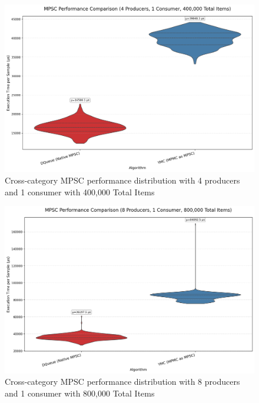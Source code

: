 \begin{figure}[H]
\centering
\caption{Cross-category MPSC performance distribution with 4 producers and 1 consumer with 400,000 Total Items}
\label{fig:cross-mpsc-violin-4p}
\includegraphics[width=\textwidth]{images/results/best_in_mpsc_performance_violin_4P1C.png}
\end{figure}

\begin{figure}[H]
\centering
\caption{Cross-category MPSC performance distribution with 8 producers and 1 consumer with 800,000 Total Items}
\label{fig:cross-mpsc-violin-8p}
\includegraphics[width=\textwidth]{images/results/best_in_mpsc_performance_violin_8P1C.png}
\end{figure}

